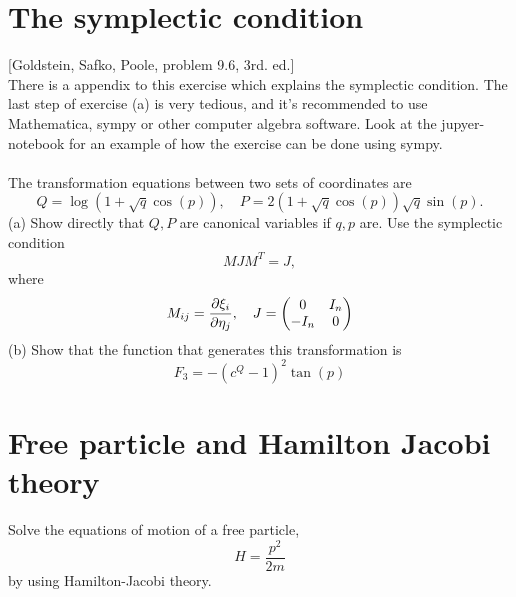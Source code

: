 \documentclass{article}
\begin{document}
    \section{The symplectic condition}
        [Goldstein, Safko, Poole, problem 9.6, 3rd. ed.] \\
        There is a appendix to this exercise which explains the symplectic condition. The last step of exercise (a) is very tedious, and it's recommended to use Mathematica, sympy or other computer algebra software. Look at the jupyer-notebook for an example of how the exercise can be done using sympy. \\ \\
        The transformation equations between two sets of coordinates are
        \begin{equation*}
            Q = \log\left(1 + \sqrt{q} \cos(p)\right), \quad P = 2\left(1 + \sqrt{q}\cos(p)\right)\sqrt{q}\sin(p).
        \end{equation*}
        (a) Show directly that $Q, P$ are canonical variables if $q, p$ are. Use the symplectic condition 
        \begin{equation*}
            M J M^T = J,
        \end{equation*}
        where 
        \begin{equation*}
            M_{ij} = \pdv{\xi_i}{\eta_j}, \quad
            J = \begin{pmatrix*}
                0 & I_n \\
                -I_n & 0 \\
            \end{pmatrix*}
        \end{equation*}
        (b) Show that the function that generates this transformation is 
        \begin{equation*}
            F_3 = -(c^Q - 1)^2 \tan(p)
        \end{equation*}

    \section{Free particle and Hamilton Jacobi theory}
        Solve the equations of motion of a free particle, 
        \begin{equation*}
            H = \frac{p^2}{2m}
        \end{equation*}
        by using Hamilton-Jacobi theory.
\end{document}
